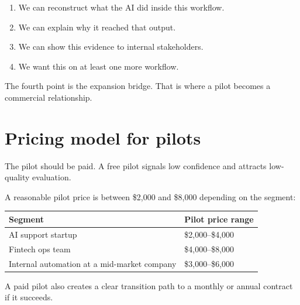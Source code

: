 \begin{enumerate}
  \item We can reconstruct what the AI did inside this workflow.
  \item We can explain why it reached that output.
  \item We can show this evidence to internal stakeholders.
  \item We want this on at least one more workflow.
\end{enumerate}

The fourth point is the expansion bridge.
That is where a pilot becomes a commercial relationship.

\section{Pricing model for pilots}

The pilot should be paid.
A free pilot signals low confidence and attracts low-quality evaluation.

A reasonable pilot price is between \$2,000 and \$8,000 depending on the segment:

\begin{center}
\renewcommand{\arraystretch}{1.5}
\begin{tabularx}{0.88\textwidth}{@{}lX@{}}
\toprule
\textbf{Segment} & \textbf{Pilot price range} \\
\midrule
AI support startup & \$2,000--\$4,000 \\
Fintech ops team & \$4,000--\$8,000 \\
Internal automation at a mid-market company & \$3,000--\$6,000 \\
\bottomrule
\end{tabularx}
\end{center}

A paid pilot also creates a clear transition path to a monthly or annual contract if it succeeds.
